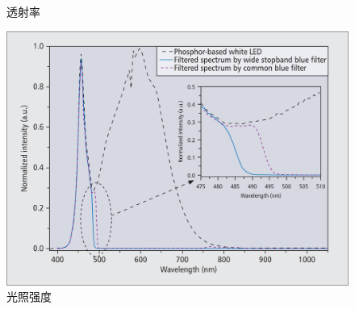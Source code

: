 \begin{frame}[c]
\begin{columns}
\begin{column}{.3\textwidth}
\begin{figure}[H]
                \caption{透射率} %
            \end{figure}
            \begin{figure}[H] %
                \centering %
                \includegraphics[width=1.1\textwidth]{figures/A high-performance blue filter for a white-led-based visible light communication system_2.png} %
                \caption{光照强度} %
            \end{figure}
        \end{column}
    \end{columns}
\end{frame}

